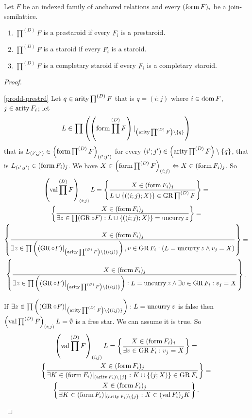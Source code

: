\begin{prop}
Let $F$ be an indexed family of anchored relations and every $(\operatorname{form} F)_{i}$
be a join-semilattice.
\begin{enumerate}
\item \label{prodd-prestrd}$\prod^{(D)}F$ is a prestaroid if every $F_{i}$
is a prestaroid.
\item \label{prodd-strd}$\prod^{(D)}F$ is a staroid if every $F_{i}$
is a staroid.
\item \label{prodd-cmpl}$\prod^{(D)}F$ is a completary staroid if every
$F_{i}$ is a completary staroid.
\end{enumerate}
\end{prop}
\begin{proof}
~
\begin{widedisorder}
\item [{\ref{prodd-prestrd}}] Let $q\in\operatorname{arity}\prod^{(D)}F$ that is $q=(i;j)$
where $i\in\operatorname{dom} F$, $j\in\operatorname{arity} F_{i}$; let 
\[
L\in\prod\left(\left(\operatorname{form}\prod^{(D)}F\right)|_{\left(\operatorname{arity}\prod^{(D)}F\right)\setminus\{q\}}\right)
\]
that is $L_{(i';j')}\in\left(\operatorname{form}\prod^{(D)}F\right)_{(i';j')}$
for every $(i';j')\in\left(\operatorname{arity}\prod^{(D)}F\right)\setminus\{q\}$,
that is $L_{(i';j')}\in(\operatorname{form} F_{i})_{j}$. We have $X\in\left(\operatorname{form}\prod^{(D)}F\right)_{(i;j)}\Leftrightarrow X\in(\operatorname{form} F_{i})_{j}$.
So
\begin{gather*}
\left(\operatorname{val}\prod^{(D)}F\right)_{(i;j)}L=\left\{ \frac{X\in(\operatorname{form} F_{i})_{j}}{L\cup\{((i;j);X)\}\in\operatorname{GR}\prod^{(D)}F}\right\}=\\
\left\{ \frac{X\in(\operatorname{form} F_{i})_{j}}{\exists z\in\prod(\operatorname{GR}\circ F):L\cup\{((i;j);X)\}=\operatorname{uncurry} z}\right\}=\\
\left\{ \frac{X\in(\operatorname{form} F_{i})_{j}}{\exists z\in\prod\left((\operatorname{GR}\circ F)|_{\left(\operatorname{arity}\prod^{(D)}F\right)\setminus\{(i;j)\}}\right),v\in\operatorname{GR} F_{i}:(L=\operatorname{uncurry} z\land v_{j}=X)}\right\}=\\
\left\{ \frac{X\in(\operatorname{form} F_{i})_{j}}{\exists z\in\prod\left((\operatorname{GR}\circ F)|_{\left(\operatorname{arity}\prod^{(D)}F\right)\setminus\{(i;j)\}}\right):L=\operatorname{uncurry} z\land\exists v\in\operatorname{GR} F_{i}:v_{j}=X}\right\}.
\end{gather*}



If $\exists z\in\prod\left((\operatorname{GR}\circ F)|_{\left(\operatorname{arity}\prod^{(D)}F\right)\setminus\{(i;j)\}}\right):L=\operatorname{uncurry} z$
is false then $\left(\operatorname{val}\prod^{(D)}F\right)_{(i;j)}L=\emptyset$
is a free star. We can assume it is true. So
\begin{gather*}
\left(\operatorname{val}\prod^{(D)}F\right)_{(i;j)}L=\left\{ \frac{X\in(\operatorname{form} F_{i})_{j}}{\exists v\in\operatorname{GR} F_{i}:v_{j}=X}\right\}=\\
\left\{ \frac{X\in(\operatorname{form} F_{i})_{j}}{\exists K\in(\operatorname{form} F_{i})|_{(\operatorname{arity} F_{i})\setminus\{j\}}:K\cup\{(j;X)\}\in\operatorname{GR} F_{i}}\right\}=\\
\left\{ \frac{X\in(\operatorname{form} F_{i})_{j}}{\exists K\in(\operatorname{form} F_{i})|_{(\operatorname{arity} F_{i})\setminus\{j\}}:X\in(\operatorname{val} F_{i})_{j}K}\right\}.
\end{gather*}




\end{widedisorder}
\end{proof}
